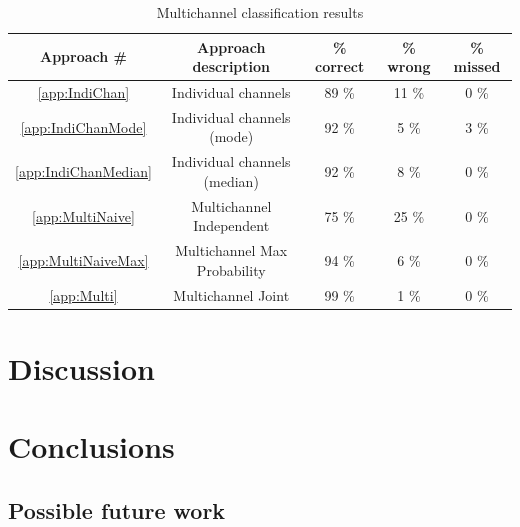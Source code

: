 \begin{table}\begin{center}
\caption{Multichannel classification results}
\label{tab:multiAPRresults}
\begin{tabular}{|c|c|c|c|c|}\hline
Approach \#             & Approach description        & \% correct    & \% wrong  & \% missed  \\ \hline
\ref{app:IndiChan}      & Individual channels         & 89 \%         & 11 \%     & 0 \%       \\
\ref{app:IndiChanMode}  & Individual channels (mode)  & 92 \%         & 5 \%      & 3 \%       \\
\ref{app:IndiChanMedian}& Individual channels (median)& 92 \%         & 8 \%      & 0 \%       \\
\ref{app:MultiNaive}    & Multichannel Independent    & 75 \%         & 25 \%     & 0 \%       \\
\ref{app:MultiNaiveMax} & Multichannel Max Probability& 94 \%         & 6 \%      & 0 \%       \\ 
\ref{app:Multi}         & Multichannel Joint          & 99 \%         & 1 \%      & 0 \%       \\ \hline
\end{tabular}\end{center}\end{table}

\section{Discussion}
\section{Conclusions}

\subsection{Possible future work}



